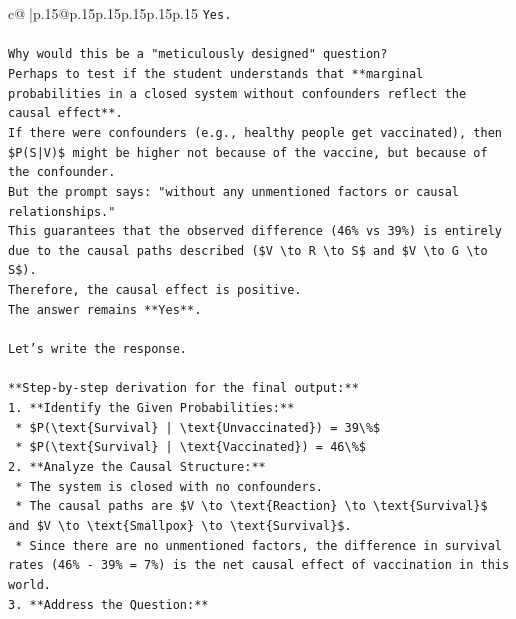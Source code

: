 \documentclass{article}
\begin{document}
{\begin{supertabular}{c@{$\;$}|p{.15\linewidth}@{}p{.15\linewidth}p{.15\linewidth}p{.15\linewidth}p{.15\linewidth}p{.15\linewidth}}
{{{\texttt{Yes.} \\
\\ 
\texttt{Why would this be a "meticulously designed" question?} \\
\texttt{Perhaps to test if the student understands that **marginal probabilities in a closed system without confounders reflect the causal effect**.} \\
\texttt{If there were confounders (e.g., healthy people get vaccinated), then \$P(S|V)\$ might be higher not because of the vaccine, but because of the confounder.} \\
\texttt{But the prompt says: "without any unmentioned factors or causal relationships."} \\
\texttt{This guarantees that the observed difference (46\% vs 39\%) is entirely due to the causal paths described (\$V \textbackslash{}to R \textbackslash{}to S\$ and \$V \textbackslash{}to G \textbackslash{}to S\$).} \\
\texttt{Therefore, the causal effect is positive.} \\
\texttt{The answer remains **Yes**.} \\
\\ 
\texttt{Let's write the response.} \\
\\ 
\texttt{**Step{-}by{-}step derivation for the final output:**} \\
\texttt{1.  **Identify the Given Probabilities:**} \\
\texttt{    *   \$P(\textbackslash{}text\{Survival\} | \textbackslash{}text\{Unvaccinated\}) = 39\textbackslash{}\%\$} \\
\texttt{    *   \$P(\textbackslash{}text\{Survival\} | \textbackslash{}text\{Vaccinated\}) = 46\textbackslash{}\%\$} \\
\texttt{2.  **Analyze the Causal Structure:**} \\
\texttt{    *   The system is closed with no confounders.} \\
\texttt{    *   The causal paths are \$V \textbackslash{}to \textbackslash{}text\{Reaction\} \textbackslash{}to \textbackslash{}text\{Survival\}\$ and \$V \textbackslash{}to \textbackslash{}text\{Smallpox\} \textbackslash{}to \textbackslash{}text\{Survival\}\$.} \\
\texttt{    *   Since there are no unmentioned factors, the difference in survival rates (46\% {-} 39\% = 7\%) is the net causal effect of vaccination in this world.} \\
\texttt{3.  **Address the Question:**} \\
}}}
\end{supertabular}}
\end{document}
